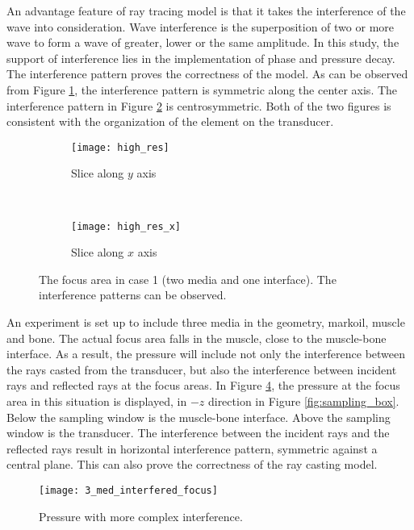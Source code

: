 An advantage feature of ray tracing model is that it takes the interference of the wave into consideration. Wave interference is the superposition of two or more wave to form a wave of greater, lower or the same amplitude. In this study, the support of interference lies in the implementation of phase and pressure decay. The interference pattern proves the correctness of the model. As can be observed from Figure \ref{fig:interference-a}, the interference pattern is symmetric along the center axis. The interference pattern in Figure \ref{fig:interference-b} is centrosymmetric. Both of the two figures is consistent with the organization of the element on the transducer.

\begin{figure}[h]
    \centering
    \begin{subfigure}[b]{0.45\textwidth}
        \texttt{[image: high\_res]}
        \caption{Slice along $y$ axis}
        \label{fig:interference-a}
    \end{subfigure}
    ~ %
    \begin{subfigure}[b]{0.45\textwidth}
        \texttt{[image: high\_res\_x]}
        \caption{Slice along $x$ axis}
        \label{fig:interference-b}
    \end{subfigure}
    \caption{The focus area in case 1 (two media and one interface). The interference patterns can be observed.} \label{fig:interference}
\end{figure}

An experiment is set up to include three media in the geometry, markoil, muscle and bone. The actual focus area falls in the muscle, close to the muscle-bone interface. As a result, the pressure will include not only the interference between the rays casted from the transducer, but also the interference between incident rays and reflected rays at the focus areas. In Figure \ref{fig:3_med_interfered_focus}, the pressure at the focus area in this situation is displayed, in $-z$ direction in Figure \ref{fig:sampling_box}. Below the sampling window is the muscle-bone interface. Above the sampling window is the transducer. The interference between the incident rays and the reflected rays result in horizontal interference pattern, symmetric against a central plane. This can also prove the correctness of the ray casting model. 

\begin{figure}[h]
    \centering
    \texttt{[image: 3\_med\_interfered\_focus]}
    \caption{Pressure with more complex interference.}
    \label{fig:3_med_interfered_focus}
\end{figure}


